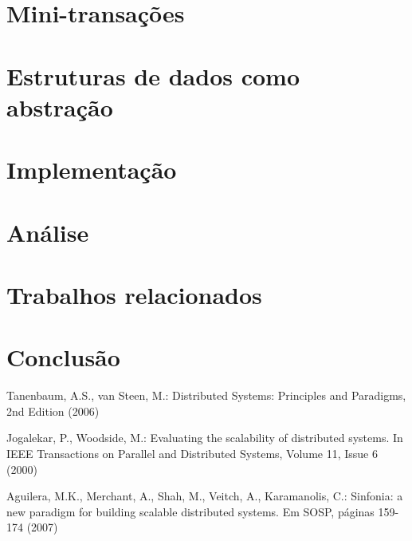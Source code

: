 \documentclass[a4paper,12pt]{report}
\begin{document}
\chapter{Mini-transações}
\chapter{Estruturas de dados como abstração}
\chapter{Implementação}
\chapter{Análise}
\chapter{Trabalhos relacionados}
\chapter{Conclusão}

\begin{thebibliography}{99}

 Tanenbaum, A.S., van Steen, M.: Distributed Systems: Principles and Paradigms, 2nd Edition (2006)

 Jogalekar, P., Woodside, M.: Evaluating the scalability of distributed systems. In IEEE Transactions on Parallel and Distributed Systems, Volume 11, Issue 6 (2000)

 Aguilera, M.K., Merchant, A., Shah, M., Veitch, A., Karamanolis, C.: Sinfonia: a new paradigm for building scalable distributed systems. Em SOSP, páginas 159-174 (2007)

\end{thebibliography}
\end{document}
